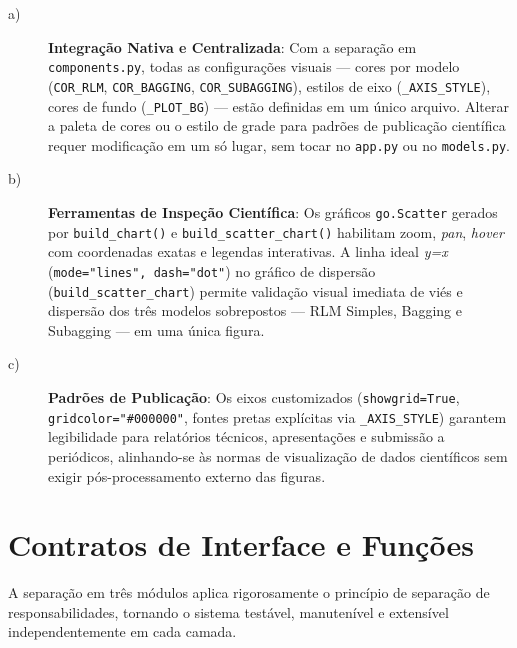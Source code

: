 \begin{description}

\item[a)] \textbf{Integração Nativa e Centralizada}: Com a separação em
\texttt{components.py}, todas as configurações visuais — cores por modelo
(\texttt{COR\_RLM}, \texttt{COR\_BAGGING}, \texttt{COR\_SUBAGGING}), estilos de eixo
(\texttt{\_AXIS\_STYLE}), cores de fundo (\texttt{\_PLOT\_BG}) — estão definidas em um
único arquivo. Alterar a paleta de cores ou o estilo de grade para padrões de publicação
científica requer modificação em um só lugar, sem tocar no \texttt{app.py} ou no
\texttt{models.py}.

\item[b)] \textbf{Ferramentas de Inspeção Científica}: Os gráficos \texttt{go.Scatter}
gerados por \texttt{build\_chart()} e \texttt{build\_scatter\_chart()} habilitam zoom,
\textit{pan}, \textit{hover} com coordenadas exatas e legendas interativas. A linha ideal
\textit{y=x} (\texttt{mode="lines", dash="dot"}) no gráfico de dispersão
(\texttt{build\_scatter\_chart}) permite validação visual imediata de viés e dispersão
dos três modelos sobrepostos — RLM Simples, Bagging e Subagging — em uma única figura.

\item[c)] \textbf{Padrões de Publicação}: Os eixos customizados (\texttt{showgrid=True},
\texttt{gridcolor="\#000000"}, fontes pretas explícitas via \texttt{\_AXIS\_STYLE})
garantem legibilidade para relatórios técnicos, apresentações e submissão a periódicos,
alinhando-se às normas de visualização de dados científicos sem exigir pós-processamento
externo das figuras.

\end{description}

\section{Contratos de Interface e Funções}

A separação em três módulos aplica rigorosamente o princípio de separação de
responsabilidades, tornando o sistema testável, manutenível e extensível
independentemente em cada camada.

